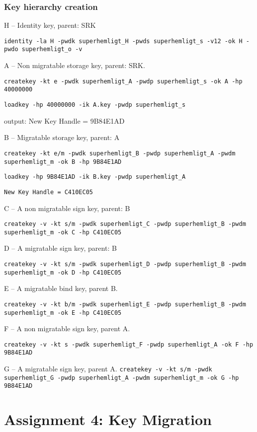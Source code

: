 \documentclass[10pt]{article}
\newcommand{\command}[1]{\texttt{#1}}
\begin{document}
    \subsubsection{Key hierarchy creation}

    H -- Identity key, parent: SRK

    \command{identity -la H -pwdk superhemligt\_H -pwds superhemligt\_s -v12 -ok H -pwdo superhemligt\_o -v}

    A -- Non migratable storage key, parent: SRK.

    \command{createkey -kt e -pwdk superhemligt\_A -pwdp superhemligt\_s -ok A
    -hp 40000000}

    \command{loadkey -hp 40000000 -ik A.key -pwdp superhemligt\_s}

    output: New Key Handle = 9B84E1AD

    B -- Migratable storage key, parent: A

    \command{createkey -kt e/m -pwdk superhemligt\_B -pwdp superhemligt\_A
    -pwdm \\ superhemligt\_m -ok B -hp 9B84E1AD}

    \command{loadkey -hp 9B84E1AD -ik B.key -pwdp superhemligt\_A}

    \command{New Key Handle = C410EC05}

    C -- A non migratable sign key, parent: B

    \command{createkey -v -kt s/m -pwdk superhemligt\_C -pwdp superhemligt\_B
    -pwdm superhemligt\_m -ok C -hp C410EC05}

    D -- A migratable sign key, parent: B

    \command{createkey -v -kt s/m -pwdk superhemligt\_D -pwdp superhemligt\_B -pwdm superhemligt\_m -ok D -hp C410EC05}

    E -- A migratable bind key, parent B.

    \command{createkey -v -kt b/m -pwdk superhemligt\_E -pwdp superhemligt\_B -pwdm superhemligt\_m -ok E -hp C410EC05}

    F -- A non migratable sign key, parent A.

    \command{createkey -v -kt s -pwdk superhemligt\_F -pwdp superhemligt\_A -ok F -hp 9B84E1AD}

    G -- A migratable sign key, parent A.
    \command{createkey -v -kt s/m -pwdk superhemligt\_G -pwdp superhemligt\_A -pwdm superhemligt\_m -ok G -hp 9B84E1AD}

\section{Assignment 4: Key Migration}
\end{document}
